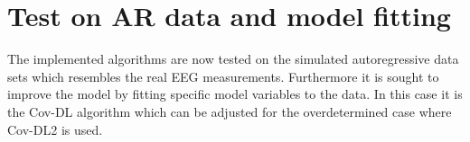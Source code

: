 \section{Test on AR data and model fitting}
The implemented algorithms are now tested on the simulated autoregressive data sets which resembles the real EEG measurements. Furthermore it is sought to improve the model by fitting specific model variables to the data. In this case it is the Cov-DL algorithm which can be adjusted for the overdetermined case where Cov-DL2 is used.      

 
